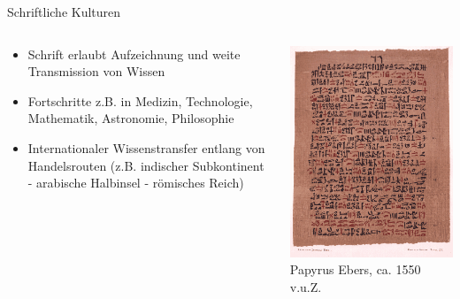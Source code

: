 \documentclass{beamer}
\begin{document}
\begin{frame}{Schriftliche Kulturen}

\begin{columns}[c]
    \begin{column}{5cm}
\begin{itemize}
    \item 
    Schrift erlaubt Aufzeichnung und weite Transmission von Wissen
    \item 
    Fortschritte z.B. in Medizin, Technologie, Mathematik, Astronomie, Philosophie
    \item 
    Internationaler Wissenstransfer entlang von Handelsrouten (z.B. indischer Subkontinent - arabische Halbinsel - römisches Reich)
\end{itemize}
        
    \end{column}

\begin{column}{5cm}
\includegraphics[width=\textwidth]{Papyrus_Ebers.png}
Papyrus Ebers, ca. 1550 v.u.Z. 

\end{column}
    
\end{columns}

\end{frame}
\end{document}
